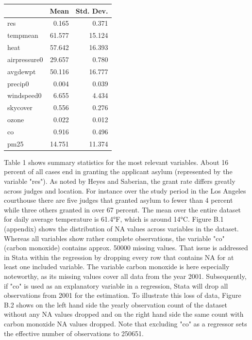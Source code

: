 \documentclass[11pt]{article}
\begin{document}
	\begin{center}
		 \label{tab:title}
		\begin{tabular}{lrr}
			\toprule
			{} &       Mean &  Std. Dev. \\
			\midrule
			res          &   0.165 &      0.371 \\
			tempmean     &  61.577 &     15.124 \\
			heat         &  57.642 &     16.393 \\
			airpressure0 &  29.657 &      0.780 \\
			avgdewpt     &  50.116 &     16.777 \\
			precip0      &   0.004 &      0.039 \\
			windspeed0   &   6.655 &      4.434 \\
			skycover     &   0.556 &      0.276 \\
			ozone        &   0.022 &      0.012 \\
			co           &   0.916 &      0.496 \\
			pm25         &  14.751 &     11.374 \\
			\bottomrule
		\end{tabular}
	\end{center}

	Table 1 shows summary statistics for the most relevant variables. About 16 percent of all cases end in granting the applicant asylum (represented by the variable "res"). As noted by Heyes and Saberian, the grant rate differs greatly across judges and location. For instance over the study period in the Los Angeles courthouse there are five judges that granted asylum to fewer than 4 percent while three others granted in over 67 percent. The mean over the entire dataset for daily average temperature is 61.4°F, which is around 14°C.
	\newline Figure B.1 (appendix) shows the distribution of NA values across variables in the dataset. Whereas all variables show rather complete observations, the variable "co" (carbon monoxide) contains approx. 50000 missing values. That issue is addressed in Stata within the regression by dropping every row that contains NA for at least one included variable. The variable carbon monoxide is here especially noteworthy, as its missing values cover all data from the year 2001. Subsequently, if "co" is used as an explanatory variable in a regression, Stata will drop all observations from 2001 for the estimation. To illustrate this loss of data, Figure B.2 shows on the left hand side the yearly observation count of the dataset without any NA values dropped and on the right hand side the same count with carbon monoxide NA values dropped. Note that excluding "co" as a regressor sets the effective number of observations to 250651.
\end{document}
